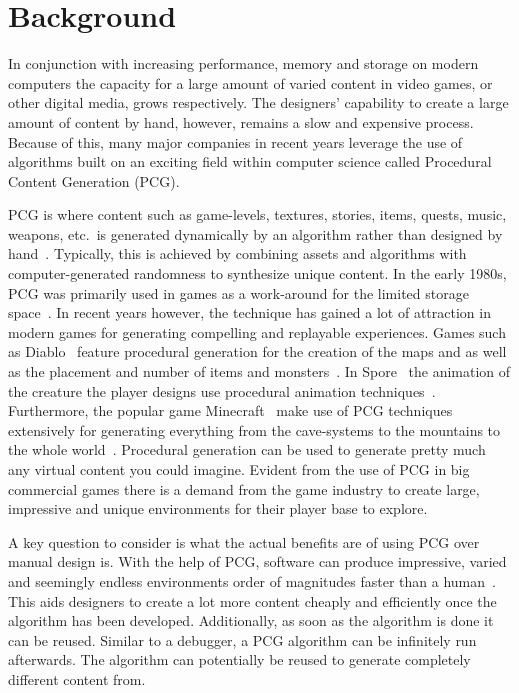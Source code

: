 \section{Background}
In conjunction with increasing performance, memory and storage on modern computers the capacity for a large amount of varied content in video games, or other digital media, grows respectively.
The designers' capability to create a large amount of content by hand, however, remains a slow and expensive process.
Because of this, many major companies in recent years leverage the use of algorithms built on an exciting field within computer science called Procedural Content Generation (PCG).

PCG is where content such as game-levels, textures, stories, items, quests, music, weapons, etc.\ is generated dynamically by an algorithm rather than designed by hand~\cite[p.1]{PCG_in_games}.
Typically, this is achieved by combining assets and algorithms with computer-generated randomness to synthesize unique content.
In the early 1980s, PCG was primarily used in games as a work-around for the limited storage space~\cite[p.4]{PCG_in_games}.
In recent years however, the technique has gained a lot of attraction in modern games for generating compelling and replayable experiences.
Games such as Diablo~\cite{diablo} feature procedural generation for the creation of the maps and as well as the placement and number of items and monsters~\cite[p.4]{PCG_in_games}.
In Spore~\cite{spore} the animation of the creature the player designs use procedural animation techniques~\cite[p.4]{PCG_in_games}.
Furthermore, the popular game Minecraft~\cite{minecraft} make use of PCG techniques extensively for generating everything from the cave-systems to the mountains to the whole world~\cite[p.4]{PCG_in_games}.
Procedural generation can be used to generate pretty much any virtual content you could imagine.
Evident from the use of PCG in big commercial games there is a demand from the game industry to create large, impressive and unique environments for their player base to explore.

A key question to consider is what the actual benefits are of using PCG over manual design is.
With the help of PCG, software can produce impressive, varied and seemingly endless environments order of magnitudes faster than a human~\cite[p.3]{PCG_in_games}.
This aids designers to create a lot more content cheaply and efficiently once the algorithm has been developed.
Additionally, as soon as the algorithm is done it can be reused. Similar to a debugger, a PCG algorithm can be infinitely run afterwards. The algorithm can potentially be reused to generate completely different content from.

